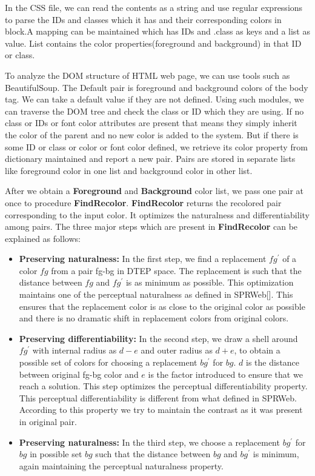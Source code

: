 In the CSS file, we can read the contents as a string and use regular expressions to parse the IDs and classes which it has and their corresponding colors in block.A mapping can be maintained which has IDs and .class as keys and a list as value. List contains the color properties(foreground and background) in that ID or class.

  
To analyze the DOM structure of HTML web page, we can use tools such as BeautifulSoup. The Default pair is foreground and background colors of the body tag. We can take a default value if they are not defined. Using such modules, we can traverse the DOM tree and check the class or ID which they are using. If no class or IDs or font color attributes are present that means they simply inherit the color of the parent and no new color is added to the system. But if there is some ID or class or color or font color defined, we retrieve its color property from dictionary maintained and report a new pair. Pairs are stored in separate lists like foreground color in one list and background color in other list. 


After we obtain a \textbf{Foreground} and \textbf{Background} color list, we pass one pair at once to procedure \textbf{FindRecolor}. \textbf{FindRecolor} returns the recolored pair corresponding to the input color. It optimizes the naturalness and differentiability among pairs. The three major steps which are present in \textbf{FindRecolor} can be explained as follows:

\begin{itemize}

\item {\textbf{Preserving naturalness:} } In the first step, we find a replacement $fg^{\prime}$ of a color $fg$ from a pair fg-bg in DTEP space. The replacement is such that the distance between $fg$ and $fg^{\prime}$ is as minimum as possible. This optimization maintains one of the perceptual naturalness as defined in SPRWeb[]. This ensures that the replacement color is as close to the original color as possible and there is no dramatic shift in replacement colors from original colors.

\item{\textbf{Preserving differentiability:} } In the second step, we draw a shell around $fg^{\prime}$ with internal radius as $d-e$ and outer radius as $d+e$, to obtain a possible set of colors for choosing a replacement $bg^{\prime}$ for $bg$. $d$ is the distance between original fg-bg color and $e$ is the factor introduced to ensure that we reach a solution. This step optimizes the perceptual differentiability property. This perceptual differentiability is different from what defined in SPRWeb. According to this property we try to maintain the contrast as it was present in original pair.

\item{\textbf{Preserving naturalness:} } In the third step, we choose a replacement $bg^{\prime}$ for $bg$ in possible set $bg$ such that the distance between $bg$ and $bg^{\prime}$ is minimum, again maintaining the perceptual naturalness property. 

\end{itemize}

